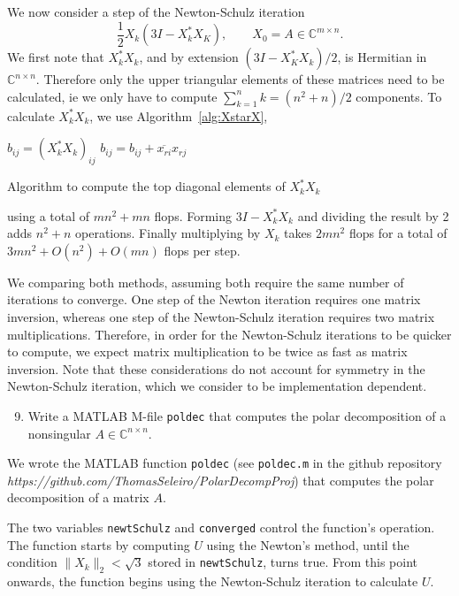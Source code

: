\documentclass[10pt, A4paper]{article}
\newcommand{\mxn}{m \times n}
\newcommand{\nxn}{n \times n}
\begin{document}
We now consider a step of the Newton-Schulz iteration $$\frac{1}{2} 
X_k(3I - X_k^*X_K), \qquad X_0 = A \in \mathbb{C}^{\mxn}.$$
We first note that $X_k^*X_k$, and by extension $(3I - X_K^*X_k)/2$, is 
Hermitian in $\mathbb{C}^{\nxn}$.
Therefore only the upper triangular elements of these matrices need to 
be calculated, ie we only have to compute $\sum_{k=1}^{n} k= (n^2+n)/2$ 
components.
To calculate $X_k^*X_k$, we use Algorithm~\ref{alg:XstarX},
\begin{algorithm}
	$b_{ij} = (X_k^*X_k)_{ij}$ \;
	{
		{
				{
					$b_{ij} = b_{ij} + \overline{x_{ri}}x_{rj}$ \;
				}
		}
	}
	\caption{Algorithm to compute the top diagonal elements of 
	$X_k^*X_k$}
	\label{alg:XstarX}
\end{algorithm}
using a total of $mn^2 + mn$ flops. Forming $3I - X_k^*X_k$ and 
dividing the result by 2 adds $n^2 + n$ operations. Finally multiplying 
by $X_k$ takes $2mn^2$ flops for a total of $3mn^2 + O(n^2) + O(mn)$ 
flops per step.

We comparing both methods, assuming both require the same number of 
iterations to converge. 
One step of the Newton iteration requires one matrix inversion, whereas 
one step of the Newton-Schulz iteration requires two matrix 
multiplications.
Therefore, in order for the Newton-Schulz iterations to be quicker to 
compute, we expect matrix multiplication to be twice as fast as matrix 
inversion.
Note that these considerations do not account for symmetry in the 
Newton-Schulz iteration, which we consider to be implementation 
dependent. 





\vspace{0.2cm}
\begin{enumerate}
	\setcounter{enumi}{8}
	\item Write a MATLAB M-file \texttt{poldec} that computes the 
	polar decomposition of a nonsingular $A \in \mathbb{C}^{\nxn}$.
\end{enumerate}

We wrote the MATLAB function \texttt{poldec} (see \texttt{poldec.m} in 
the github repository 
\emph{https://github.com/ThomasSeleiro/PolarDecompProj})
that computes the polar decomposition of a matrix $A$.

The two variables \texttt{newtSchulz} and \texttt{converged} control 
the function's operation.
The function starts by computing $U$ using the Newton's method, until
the condition $\|X_k\|_2 < \sqrt{3}$ stored in \texttt{newtSchulz},
turns true. 
From this point onwards, the function begins using the {Newton-Schulz} 
iteration to calculate $U$.
\end{document}
